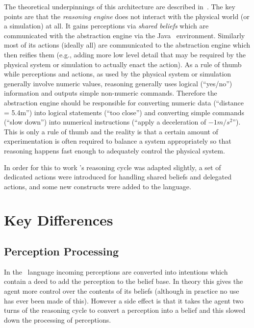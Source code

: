 \begin{sloppypar}
The theoretical underpinnings of this architecture are described in~\cite{DALT10:abstraction,Dennis2016}.  The key points are that the \emph{reasoning engine} does not interact with the physical world (or a simulation) at all.  It gains perceptions via \emph{shared beliefs} which are communicated with the abstraction engine via the Java \eass\ environment.  Similarly most of its actions (ideally all) are communicated to the abstraction engine which then reifies them (e.g., adding more low level detail that may be required by the physical system or simulation to actually enact the action).  As a rule of thumb while perceptions and actions, as used by the physical system or simulation generally involve numeric values, reasoning generally uses logical (``yes/no'') information and outputs simple non-numeric commands.  Therefore the abstraction engine should be responsible for converting numeric data (``distance = 5.4m'') into logical statements (``too close'') and converting simple commands (``slow down'') into numerical instructions (``apply a deceleration of $-1m/s^2$'').  This is only a rule of thumb and the reality is that a certain amount of experimentation is often required to balance a system appropriately so that reasoning happens fast enough to adequately control the physical system.
\end{sloppypar}

In order for this to work \gwendolen's reasoning cycle was adapted slightly, a set of dedicated actions were introduced for handling shared beliefs and delegated actions, and some new constructs were added to the language.

\section{Key Differences}
\subsection{Perception Processing}
In the \gwendolen\ language incoming perceptions are converted into intentions which contain a deed to add the perception to the belief base.  In theory this gives the agent more control over the contents of its beliefs (although in practice no use has ever been made of this).  However a side effect is that it takes the agent two turns of the reasoning cycle to convert a perception into a belief and this slowed down the processing of perceptions.

